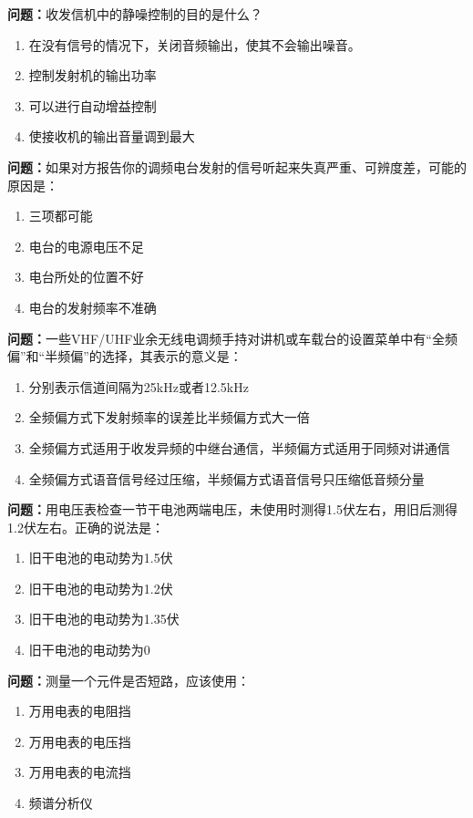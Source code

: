 \documentclass{ctexbook}%
\begin{document}
\textbf{问题：}收发信机中的静噪控制的目的是什么？
\begin{enumerate}[label=\Alph*), leftmargin=3em]
\item 在没有信号的情况下，关闭音频输出，使其不会输出噪音。
\item 控制发射机的输出功率
\item 可以进行自动增益控制
\item 使接收机的输出音量调到最大
\end{enumerate}

\textbf{问题：}如果对方报告你的调频电台发射的信号听起来失真严重、可辨度差，可能的原因是：
\begin{enumerate}[label=\Alph*), leftmargin=3em]
\item 三项都可能
\item 电台的电源电压不足
\item 电台所处的位置不好
\item 电台的发射频率不准确
\end{enumerate}

\textbf{问题：}一些VHF/UHF业余无线电调频手持对讲机或车载台的设置菜单中有“全频偏”和“半频偏”的选择，其表示的意义是：
\begin{enumerate}[label=\Alph*), leftmargin=3em]
\item 分别表示信道间隔为25kHz或者12.5kHz
\item 全频偏方式下发射频率的误差比半频偏方式大一倍
\item 全频偏方式适用于收发异频的中继台通信，半频偏方式适用于同频对讲通信
\item 全频偏方式语音信号经过压缩，半频偏方式语音信号只压缩低音频分量
\end{enumerate}

\textbf{问题：}用电压表检查一节干电池两端电压，未使用时测得1.5伏左右，用旧后测得1.2伏左右。正确的说法是：
\begin{enumerate}[label=\Alph*), leftmargin=3em]
\item 旧干电池的电动势为1.5伏
\item 旧干电池的电动势为1.2伏
\item 旧干电池的电动势为1.35伏
\item 旧干电池的电动势为0
\end{enumerate}

\textbf{问题：}测量一个元件是否短路，应该使用：
\begin{enumerate}[label=\Alph*), leftmargin=3em]
\item 万用电表的电阻挡
\item 万用电表的电压挡
\item 万用电表的电流挡
\item 频谱分析仪
\end{enumerate}
\end{document}
